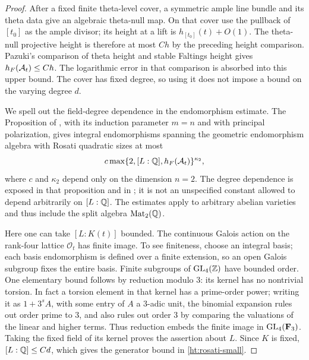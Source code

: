\begin{proof}
After a fixed finite theta-level cover, a symmetric ample line bundle
and its theta data give an algebraic theta-null map. On that cover use
the pullback of $[t_0]$ as the ample divisor; its height at a lift is
$h_{[t_0]}(t)+O(1)$. The theta-null projective height is therefore at
most $Ch$ by the preceding height comparison. Pazuki's
comparison of theta height and stable Faltings height
\cite[Corollary~1.3(1)]{Pazuki2012} gives $h_F(\mathcal A_t)\leq Ch$.
The logarithmic error in that comparison is absorbed into this upper
bound. The cover has fixed degree, so using it does not impose a bound
on the varying degree $d$.

We spell out the field-degree dependence in the endomorphism estimate.
The Proposition of \cite[\S4]{MasserWustholz1994}, with its induction
parameter $m=n$ and with principal polarization, gives integral
endomorphisms spanning the geometric endomorphism algebra with Rosati
quadratic sizes at most
\[
 c\max\{2,[L:\mathbb Q],h_F(\mathcal A_t)\}^{\kappa_2},
\]
where $c$ and $\kappa_2$ depend only on the dimension $n=2$.
The degree dependence is exposed in that proposition and in
\cite[\S5, equation~(5.3) and Lemma~5.1]{MasserWustholz1994}; it is not
an unspecified constant allowed to depend arbitrarily on $[L:\mathbb Q]$.
The estimates apply to arbitrary abelian varieties and thus include the
split algebra $\operatorname{Mat}_2(\mathbb Q)$.

Here one can take $[L:K(t)]$ bounded. The continuous Galois action on
the rank-four lattice $\mathcal O_t$ has finite image. To see finiteness,
choose an integral basis; each basis endomorphism is defined over a
finite extension, so an open Galois subgroup fixes the entire basis.
Finite subgroups of $\operatorname{GL}_4(\mathbb Z)$ have bounded order. One elementary
bound follows by reduction modulo $3$: its kernel has no nontrivial
torsion. In fact a torsion element in that kernel has a prime-order
power; writing it as $1+3^sA$, with some entry of $A$ a $3$-adic unit,
the binomial expansion rules out order prime to $3$, and also rules out
order $3$ by comparing the valuations of the linear and higher terms.
Thus reduction embeds the finite image in $\operatorname{GL}_4(\mathbf F_3)$.
Taking the fixed field of its kernel proves the assertion about $L$.
Since $K$ is fixed, $[L:\mathbb Q]\leq Cd$, which gives the generator bound
in \eqref{ht:rosati-small}.


\end{proof}

